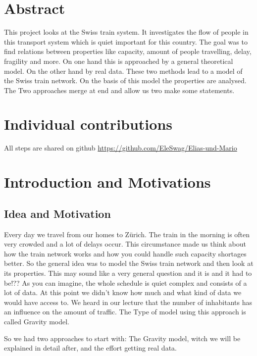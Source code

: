 \documentclass[11pt]{article}
\begin{document}
\section{Abstract}

This project looks at the Swiss train system. It investigates the flow of people in this transport system which is quiet important for this country. The goal was to find relations between properties like capacity, amount of people travelling, delay, fragility and more. On one hand this is approached  by a general theoretical model. On the other hand by real data. These two methods lead to a model of the Swiss train  network. On the basis of this model the properties are analysed. The Two approaches merge at end and allow us two make some statements.
 

\section{Individual contributions}

All steps are shared on github \citep{Github}
\url{https://github.com/EleSwag/Elias-und-Mario}

\section{Introduction and Motivations}

\subsection{Idea and Motivation}


Every day we travel from our homes to Zürich. The train in the morning is often very crowded and a lot of delays occur. This circumstance made us think about how the train network works and how you could handle such capacity shortages better. 
So the general idea was to model the Swiss train network and then look at its properties. This may sound like a very general question and it is and it had to be!?? As you can imagine, the whole schedule is quiet complex and consists of a lot of data. At this point we didn't know how much and what kind of data we would have access to. We heard in our lecture that the number of inhabitants has an influence on the amount of traffic. The Type of model using this approach is called Gravity model.

So we had two approaches to start with: The Gravity model, witch we will be explained in detail after, and the effort getting real data.
\end{document}
